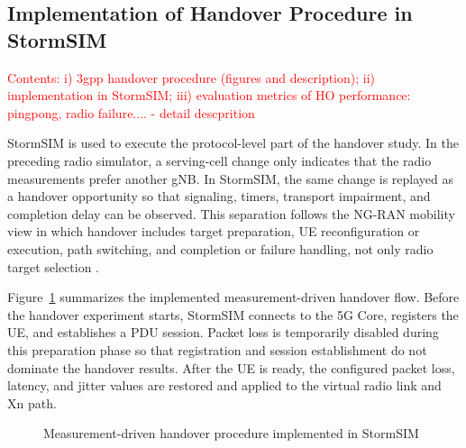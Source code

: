 \subsection{Implementation of Handover Procedure in StormSIM}

\textcolor{red}{Contents: i) 3gpp handover procedure (figures and description); ii) implementation in StormSIM; iii) evaluation metrics of HO performance: pingpong, radio failure.... - detail descprition }

StormSIM is used to execute the protocol-level part of the handover study. In
the preceding radio simulator, a serving-cell change only indicates that the
radio measurements prefer another gNB. In StormSIM, the same change is replayed
as a handover opportunity so that signaling, timers, transport impairment, and
completion delay can be observed. This separation follows the NG-RAN mobility
view in which handover includes target preparation, UE reconfiguration or
execution, path switching, and completion or failure handling, not only radio
target selection \cite{3gpp_38300,3gpp_38331,3gpp_38413}.

Figure~\ref{fig:stormsim-handover-flow} summarizes the implemented
measurement-driven handover flow. Before the handover experiment starts,
StormSIM connects to the 5G Core, registers the UE, and establishes a PDU
session. Packet loss is temporarily disabled during this preparation phase so
that registration and session establishment do not dominate the handover
results. After the UE is ready, the configured packet loss, latency, and jitter
values are restored and applied to the virtual radio link and Xn path.

\begin{figure}[H]
\centering
{}
\caption{Measurement-driven handover procedure implemented in StormSIM}
\label{fig:stormsim-handover-flow}
\end{figure}

